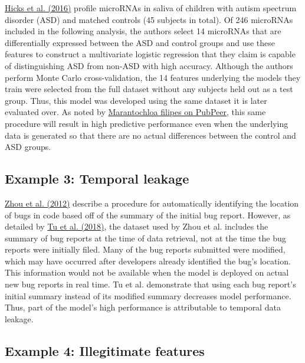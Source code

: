 \documentclass[letterpaper, 12pt]{article}
\begin{document}
\href{https://doi.org/10.1186/s12887-016-0586-x}{Hicks et al. (2016)} profile microRNAs in saliva of children with autism spectrum disorder (ASD) and matched controls (45 subjects in total). Of 246 microRNAs included in the following analysis, the authors select 14 microRNAs that are differentially expressed between the ASD and control groups and use these features to construct a multivariate logistic regression that they claim is capable of distinguishing ASD from non-ASD with high accuracy. Although the authors perform Monte Carlo cross-validation, the 14 features underlying the models they train were selected from the full dataset without any subjects held out as a test group. Thus, this model was developed using the same dataset it is later evaluated over. As noted by \href{https://pubpeer.com/publications/474BE49866A9B1F37690E6FDA5C104}{Marantochloa filipes on PubPeer}, this same procedure will result in high predictive performance even when the underlying data is generated so that there are no actual differences between the control and ASD groups.

\subsection*{Example 3: Temporal leakage}

\href{https://doi.org/10.1109/ICSE.2012.6227210}{Zhou et al. (2012)} describe a procedure for automatically identifying the location of bugs in code based off of the summary of the initial bug report. However, as detailed by \href{https://doi.org/10.1145/3236024.3236054}{Tu et al. (2018)}, the dataset used by Zhou et al. includes the summary of bug reports at the time of data retrieval, not at the time the bug reports were initially filed. Many of the bug reports submitted were modified, which may have occurred after developers already identified the bug's location. This information would not be available when the model is deployed on actual new bug reports in real time. Tu et al. demonstrate that using each bug report's initial summary instead of its modified summary decreases model performance. Thus, part of the model's high performance is attributable to temporal data leakage.

\subsection*{Example 4: Illegitimate features}
\end{document}
